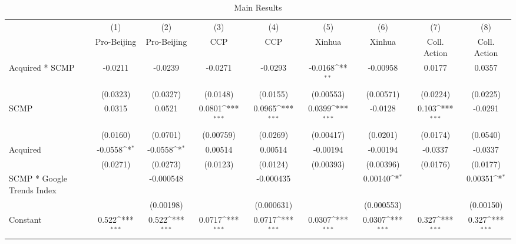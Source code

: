 \begin{sidewaystable}[htbp]\centering
\def\sym#1{\ifmmode^{#1}\else\(^{#1}\)\fi}
\caption{Main Results\label{table:main}}
\begin{tabular}{l*{8}{c}}
\hline\hline
                &\multicolumn{1}{c}{(1)}&\multicolumn{1}{c}{(2)}&\multicolumn{1}{c}{(3)}&\multicolumn{1}{c}{(4)}&\multicolumn{1}{c}{(5)}&\multicolumn{1}{c}{(6)}&\multicolumn{1}{c}{(7)}&\multicolumn{1}{c}{(8)}\\
                &\multicolumn{1}{c}{Pro-Beijing}&\multicolumn{1}{c}{Pro-Beijing}&\multicolumn{1}{c}{CCP}&\multicolumn{1}{c}{CCP}&\multicolumn{1}{c}{Xinhua}&\multicolumn{1}{c}{Xinhua}&\multicolumn{1}{c}{Coll. Action}&\multicolumn{1}{c}{Coll. Action}\\
\hline
Acquired * SCMP &  -0.0211         &  -0.0239         &  -0.0271         &  -0.0293         &  -0.0168\sym{**} & -0.00958         &   0.0177         &   0.0357         \\
                & (0.0323)         & (0.0327)         & (0.0148)         & (0.0155)         &(0.00553)         &(0.00571)         & (0.0224)         & (0.0225)         \\
[1em]
SCMP            &   0.0315         &   0.0521         &   0.0801\sym{***}&   0.0965\sym{***}&   0.0399\sym{***}&  -0.0128         &    0.103\sym{***}&  -0.0291         \\
                & (0.0160)         & (0.0701)         &(0.00759)         & (0.0269)         &(0.00417)         & (0.0201)         & (0.0174)         & (0.0540)         \\
[1em]
Acquired        &  -0.0558\sym{*}  &  -0.0558\sym{*}  &  0.00514         &  0.00514         & -0.00194         & -0.00194         &  -0.0337         &  -0.0337         \\
                & (0.0271)         & (0.0273)         & (0.0123)         & (0.0124)         &(0.00393)         &(0.00396)         & (0.0176)         & (0.0177)         \\
[1em]
SCMP * Google Trends Index&                  &-0.000548         &                  &-0.000435         &                  &  0.00140\sym{*}  &                  &  0.00351\sym{*}  \\
                &                  &(0.00198)         &                  &(0.000631)         &                  &(0.000553)         &                  &(0.00150)         \\
[1em]
Constant        &    0.522\sym{***}&    0.522\sym{***}&   0.0717\sym{***}&   0.0717\sym{***}&   0.0307\sym{***}&   0.0307\sym{***}&    0.327\sym{***}&    0.327\sym{***}\\

\end{tabular}
\end{sidewaystable}
